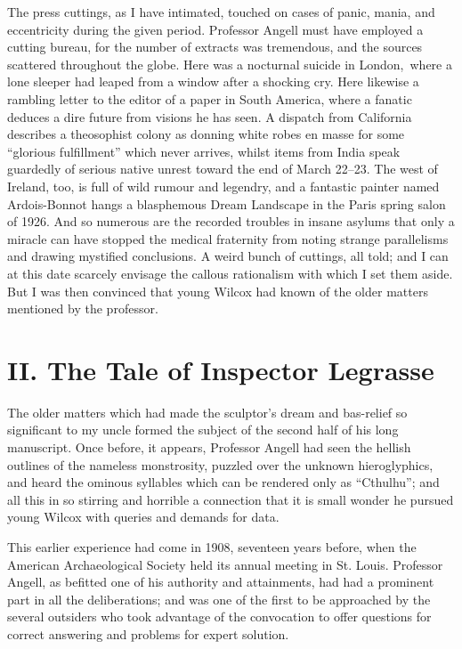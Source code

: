 The press cuttings, as I have intimated, touched on cases of panic,
mania, and eccentricity during the given period. Professor Angell must
have employed a cutting bureau, for the number of extracts was
tremendous, and the sources scattered throughout the globe. Here was a
nocturnal suicide in London,\est\ where a lone sleeper had leaped from a
window after a shocking cry. Here likewise a rambling letter to the
editor of a paper in South America, where a fanatic deduces a dire
future from visions he has seen. A dispatch from California describes a
theosophist colony as donning white robes en masse for some ``glorious
fulfillment'' which never arrives, whilst items from India speak
guardedly of serious native unrest toward the end of March 22--23.
The west of Ireland, too, is full of wild rumour and legendry, and a
fantastic painter named Ardois-Bonnot hangs a blasphemous Dream
Landscape in the Paris spring salon of 1926. And so numerous are the
recorded troubles in insane asylums that only a miracle can have stopped
the medical fraternity from noting strange parallelisms and drawing
mystified conclusions. A weird bunch of cuttings, all told; and I can at
this date scarcely envisage the callous rationalism with which I set
them aside. But I was then convinced that young Wilcox had known of the
older matters mentioned by the professor.

\chapter*{II. The Tale of Inspector Legrasse}

The older matters which had made the sculptor's dream and bas-relief so
significant to my uncle formed the subject of the second half of his
long manuscript. Once before, it appears, Professor Angell had seen the
hellish outlines of the nameless monstrosity, puzzled over the unknown
hieroglyphics, and heard the ominous syllables which can be rendered
only as ``Cthulhu''; and all this in so stirring and horrible a
connection that it is small wonder he pursued young Wilcox with queries
and demands for data.

This earlier experience had come in 1908, seventeen years before, when
the American Archaeological Society held its annual meeting in St.
Louis. Professor Angell, as befitted one of his authority and
attainments, had had a prominent part in all the deliberations; and was
one of the first to be approached by the several outsiders who took
advantage of the convocation to offer questions for correct answering
and problems for expert solution.

